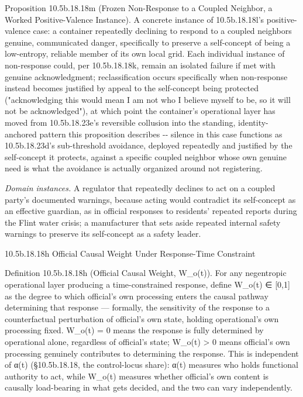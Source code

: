 \documentclass[
]{article}
\begin{document}
Proposition 10.5b.18.18m (Frozen Non-Response to a Coupled Neighbor, a
Worked Positive-Valence Instance). A concrete instance of 10.5b.18.18l's
positive-valence case: a container repeatedly declining to respond to a
coupled neighbors genuine, communicated danger, specifically to preserve
a self-concept of being a low-entropy, reliable member of its own local
grid. Each individual instance of non-response could, per 10.5b.18.18k,
remain an isolated failure if met with genuine acknowledgment;
reclassification occurs specifically when non-response instead becomes
justified by appeal to the self-concept being protected ("acknowledging
this would mean I am not who I believe myself to be, so it will not be
acknowledged"), at which point the container's operational layer has
moved from 10.5b.18.23e's reversible collusion into the standing,
identity-anchored pattern this proposition describes -\/- silence in
this case functions as 10.5b.18.23d's sub-threshold avoidance, deployed
repeatedly and justified by the self-concept it protects, against a
specific coupled neighbor whose own genuine need is what the avoidance
is actually organized around not registering.

\emph{Domain instances.} A regulator that repeatedly declines to act on
a coupled party's documented warnings, because acting would contradict
its self-concept as an effective guardian, as in official responses to
residents' repeated reports during the Flint water crisis; a
manufacturer that sets aside repeated internal safety warnings to
preserve its self-concept as a safety leader.

10.5b.18.18h Official Causal Weight Under Response-Time Constraint

Definition 10.5b.18.18h (Official Causal Weight, W\_o(t)). For any
negentropic operational layer producing a time-constrained response,
define W\_o(t) ∈ {[}0,1{]} as the degree to which official's own
processing enters the causal pathway determining that response ---
formally, the sensitivity of the response to a counterfactual
perturbation of official's own state, holding operational's own
processing fixed. W\_o(t) = 0 means the response is fully determined by
operational alone, regardless of official's state; W\_o(t)
\textgreater{} 0 means official's own processing genuinely contributes
to determining the response. This is independent of α(t) (§10.5b.18.18,
the control-locus share): α(t) measures who holds functional authority
to act, while W\_o(t) measures whether official's own content is
causally load-bearing in what gets decided, and the two can vary
independently.
\end{document}
